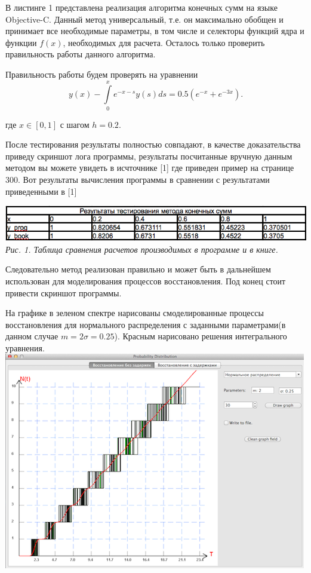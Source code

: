В листинге 1 представлена реализация алгоритма конечных сумм на языке Objective-C. Данный метод универсальный, т.е. он максимально обобщен и принимает все необходимые параметры, в том числе и селекторы функций ядра и функции $f(x)$, необходимых для расчета. Осталось только проверить правильность работы данного алгоритма.

Правильность работы будем проверять на уравнении
\begin{equation}
y(x) - \int\limits_0^x e^{-x-s} y(s) ds = 0.5 (e^{-x} + e^{-3x}).
\end{equation}

где $x \in [0, 1]$ с шагом $h = 0.2$.

После тестирования результаты полностью совпадают, в качестве доказательства приведу скриншот лога программы, результаты посчитанные вручную данным методом вы можете увидеть в исчточнике [1] где приведен пример на странице 300. Вот результаты вычисления программы в сравнении с результатами приведенными в [1]

\includegraphics{Log.png} 
\textit{Рис. 1. Таблица сравнения расчетов производимых в программе и в книге.}

Следовательно метод реализован правильно и может быть в дальнейшем использован  для моделирования процессов восстановления. Под конец стоит привести скриншот программы.

На графике в зеленом спектре нарисованы смоделированные процессы восстановления для нормального распределения с заданными параметрами(в данном случае $m = 2 \sigma = 0.25$). Красным нарисовано решения интегрального уравнения.
\includegraphics*{SampleProgramm.png} 

